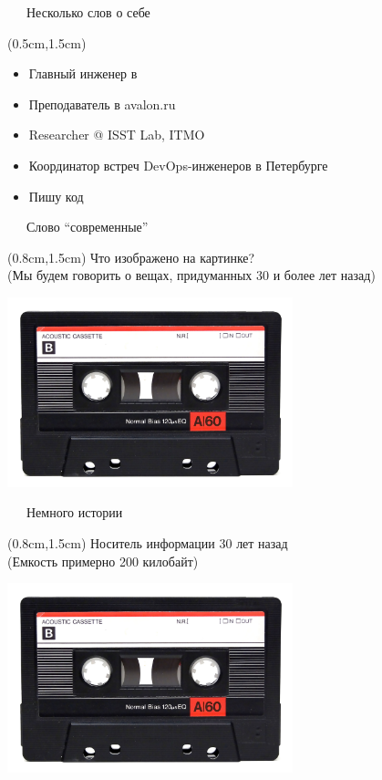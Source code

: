 \documentclass[xetex,18pt,aspectratio=43]{beamer}
\begin{document}
\begin{Large}
\begin{frame}{\ \ \ Несколько слов о себе}
\begin{textblock*}{\framewidth-0.8cm}(0.5cm,1.5cm)
\begin{itemize}
  \item Главный инженер в \href{https://gitinsky.com}{\color{blue}{Git in Sky}}
  \item Преподаватель в avalon.ru
  \item Researcher @ ISST Lab, ITMO
  \item Координатор встреч DevOps-инженеров в Петербурге
  \item Пишу код
\end{itemize}
\end{textblock*}
\end{frame}

\begin{frame}{\ \ \ Слово \enquote{современные}}
\begin{textblock*}{\framewidth}(0.8cm,1.5cm)
Что изображено на картинке?\\
{\small (Мы будем говорить о вещах, придуманных 30 и более лет назад)}
\begin{minipage}{\textwidth}
  \centering
  \includegraphics[height=5.5cm]{img/cassette}
\end{minipage}
\end{textblock*}
\end{frame}

\begin{frame}{\ \ \ Немного истории}
\begin{textblock*}{\framewidth}(0.8cm,1.5cm)
Носитель информации 30 лет назад\\
{\small (Емкость примерно 200 килобайт)}
\begin{minipage}{\textwidth}
  \centering
  \includegraphics[height=5.5cm]{img/cassette}
\end{minipage}
\end{textblock*}
\end{frame}


\end{Large}
\end{document}
